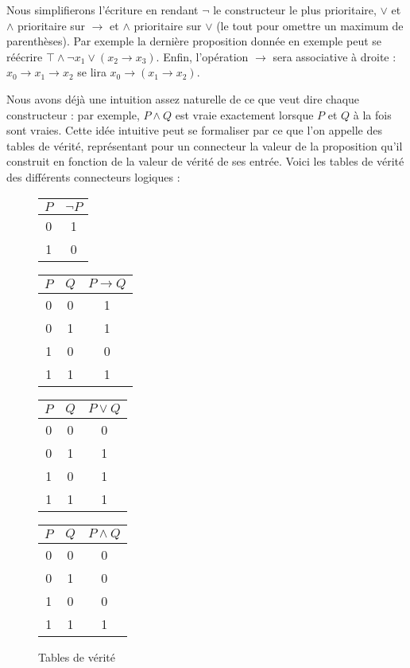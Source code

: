 \begin{rmk}
    Nous simplifierons l'écriture en rendant $\lnot$ le constructeur le plus prioritaire, $\lor$ et $\land$ prioritaire sur $\to$ et $\land$ prioritaire sur $\lor$ (le tout pour omettre un maximum de parenthèses). Par exemple la dernière proposition donnée en exemple peut se réécrire $\top\land \lnot x_1 \lor (x_2\to x_3)$. Enfin, l'opération $\to$ sera associative à droite : $x_0 \to x_1 \to x_2$ se lira $x_0 \to (x_1\to x_2)$.
\end{rmk}

Nous avons déjà une intuition assez naturelle de ce que veut dire chaque constructeur : par exemple, $P\land Q$ est vraie exactement lorsque $P$ et $Q$ à la fois sont vraies. Cette idée intuitive peut se formaliser par ce que l'on appelle des tables de vérité, représentant pour un connecteur la valeur de la proposition qu'il construit en fonction de la valeur de vérité de ses entrée. Voici les tables de vérité des différents connecteurs logiques :

{\begin{figure}[htb]
\centering
\begin{tabular}{|c|c|}
    \hline
     $P$ & $\lnot P$ \\ \hline\hline
     0 & 1 \\ \hline
     1 & 0 \\ \hline
\end{tabular}
\quad
\begin{tabular}{|c|c|c|}
    \hline
     $P$ & $Q$ & $P\to Q$ \\ \hline\hline
     0 & 0 & 1\\ \hline
     0 & 1 & 1\\ \hline
     1 & 0 & 0\\ \hline
     1 & 1 & 1\\ \hline
\end{tabular}
\quad
\begin{tabular}{|c|c|c|}
    \hline
     $P$ & $Q$ & $P\lor Q$  \\ \hline\hline
     0 & 0 & 0 \\ \hline
     0 & 1 & 1 \\ \hline
     1 & 0 & 1 \\ \hline
     1 & 1 & 1\\ \hline
\end{tabular}
\quad
\begin{tabular}{|c|c|c|}
    \hline
     $P$ & $Q$ & $P\land Q$ \\ \hline\hline
     0 & 0 & 0 \\ \hline
     0 & 1 & 0 \\ \hline
     1 & 0 & 0 \\ \hline
     1 & 1 & 1 \\ \hline
\end{tabular}
\caption{Tables de vérité}
\end{figure}}
\newpage

